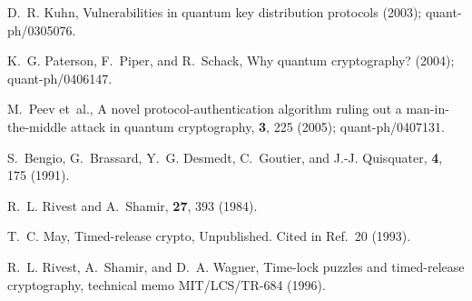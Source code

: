 \documentclass{ws-ijqi}
\begin{document}
\begin{thebibliography}{10}
D.~R. Kuhn,
\newblock Vulnerabilities in quantum key distribution protocols (2003);
\newblock quant-ph/0305076.

K.~G. Paterson, F.~Piper, and R.~Schack,
\newblock Why quantum cryptography? (2004);
\newblock quant-ph/0406147.

M.~Peev et~al.,
\newblock A novel protocol-authentication algorithm ruling out a
  man-in-the-middle attack in quantum cryptography,
 {\bf 3}, 225 (2005);
\newblock quant-ph/0407131.

S.~Bengio, G.~Brassard, Y.~G. Desmedt, C.~Goutier, and J.-J. Quisquater,
 {\bf 4}, 175 (1991).

R.~L. Rivest and A.~Shamir,
 {\bf 27}, 393 (1984).

T.~C. May,
\newblock Timed-release crypto,
\newblock Unpublished. Cited in Ref.~20 (1993).

R.~L. Rivest, A.~Shamir, and D.~A. Wagner,
\newblock Time-lock puzzles and timed-release cryptography,
 technical memo MIT/LCS/TR-684 (1996).

\end{thebibliography}
\end{document}
